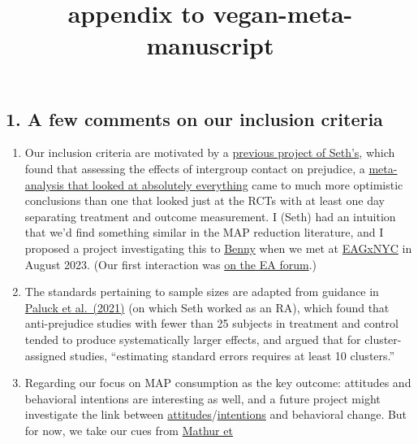 \documentclass[
  letterpaper,
  DIV=11,
  numbers=noendperiod]{scrartcl}
\title{appendix to vegan-meta-manuscript}
\author{}
\date{}
\begin{document}
\maketitle

\subsection{1. A few comments on our inclusion
criteria}\label{a-few-comments-on-our-inclusion-criteria}

\begin{enumerate}
\def\labelenumi{\arabic{enumi}.}
\item
  Our inclusion criteria are motivated by a
  \href{https://doi.org/10.1017/bpp.2018.25}{previous project of
  Seth's}, which found that assessing the effects of intergroup contact
  on prejudice, a
  \href{https://psycnet.apa.org/record/2006-07099-004}{meta-analysis
  that looked at absolutely everything} came to much more optimistic
  conclusions than one that looked just at the RCTs with at least one
  day separating treatment and outcome measurement. I (Seth) had an
  intuition that we'd find something similar in the MAP reduction
  literature, and I proposed a project investigating this to
  \href{https://forum.effectivealtruism.org/users/benny-smith?from=post_header}{Benny}
  when we met at
  \href{https://www.effectivealtruism.org/ea-global/events/eagxnyc}{EAGxNYC}
  in August 2023. (Our first interaction was
  \href{https://forum.effectivealtruism.org/posts/MWkG4F86p4pyE3Sx9/is-stirring-up-anger-good-for-vegan-outreach?commentId=hC2BnuBTWFuBispCz}{on
  the EA forum}.)
\item
  The standards pertaining to sample sizes are adapted from guidance in
  \href{https://www.annualreviews.org/doi/abs/10.1146/annurev-psych-071620-030619}{Paluck
  et al.~(2021)} (on which Seth worked as an RA), which found that
  anti-prejudice studies with fewer than 25 subjects in treatment and
  control tended to produce systematically larger effects, and argued
  that for cluster-assigned studies, ``estimating standard errors
  requires at least 10 clusters.''
\item
  Regarding our focus on MAP consumption as the key outcome: attitudes
  and behavioral intentions are interesting as well, and a future
  project might investigate the link between
  \href{https://jacyanthis.com/Testing_the_Effectiveness.pdf}{attitudes}/\href{https://pubmed.ncbi.nlm.nih.gov/21816186/}{intentions}
  and behavioral change. But for now, we take our cues from
  \href{https://www.mdpi.com/2072-6643/13/12/4555}{Mathur et
}
\end{enumerate}
\end{document}
